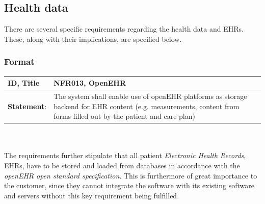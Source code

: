 \documentclass{article}
\begin{document}
\subsection{Health data}
There are several specific requirements regarding the health data and EHRs. These, along with their implications, are specified below.

\subsubsection{Format}
\begin{tabularx}{\linewidth}{| l | X |}
\hline
\textbf{ID, Title} & NFR013, OpenEHR \\ 
\hline
\textbf{Statement}: & The system shall enable use of openEHR platforms as storage backend for EHR content (e.g. measurements, content from forms filled out by the patient and care plan) \\
\hline
\end{tabularx}
\\ \\
The requirements further stipulate that all patient \emph{Electronic Health Records}, EHRs, have to be stored and loaded from databases in accordance with the \emph{openEHR open standard specification}. This is furthermore of great importance to the customer, since they cannot integrate the software with its existing software and servers without this key requirement being fulfilled.
\end{document}
